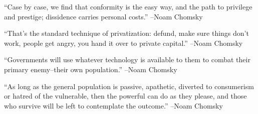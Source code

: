 \documentclass{article}%
\begin{document}
\linebreak%
\vspace{1mm}%
\begin{minipage}{\textwidth}%
\flushleft%
“Case by case, we find that conformity is the easy way, and the path to privilege and prestige; dissidence carries personal costs.”%
\linebreak%
\vspace{1mm}%
–Noam Chomsky%
\linebreak%
\vspace{1mm}%
\end{minipage}%
\linebreak%
\vspace{1mm}%
\begin{minipage}{\textwidth}%
\flushleft%
“That's the standard technique of privatization: defund, make sure things don't work, people get angry, you hand it over to private capital.”%
\linebreak%
\vspace{1mm}%
–Noam Chomsky%
\linebreak%
\vspace{1mm}%
\end{minipage}%
\linebreak%
\vspace{1mm}%
\begin{minipage}{\textwidth}%
\flushleft%
“Governments will use whatever technology is available to them to combat their primary enemy–their own population.”%
\linebreak%
\vspace{1mm}%
–Noam Chomsky%
\linebreak%
\vspace{1mm}%
\end{minipage}%
\linebreak%
\vspace{1mm}%
\begin{minipage}{\textwidth}%
\flushleft%
“As long as the general population is passive, apathetic, diverted to consumerism or hatred of the vulnerable, then the powerful can do as they please, and those who survive will be left to contemplate the outcome.”%
\linebreak%
\vspace{1mm}%
–Noam Chomsky%
\linebreak%
\vspace{1mm}%
\end{minipage}%
\linebreak%
\vspace{1mm}%
\end{document}
